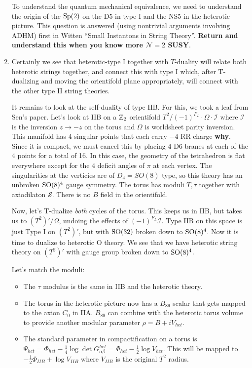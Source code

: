 \documentclass[11pt, class=article, crop=false]{standalone}
\begin{document}
\begin{enumerate}
	 To understand the quantum mechanical equivalence, we need to understand the origin of the $\mathrm{Sp}(2)$ on the D5 in type I and the NS5 in the heterotic picture. This question is answered (using nontrivial arguments involving ADHM) first in Witten ``Small Instantons in String Theory''. \textbf{Return and understand this when you know more $\mathcal N =2$ SUSY}.
	
	
	
	\item Certainly we see that heterotic-type I together with $T$-duality will relate both heterotic strings together, and connect this with type I which, after T-dualizing and moving the orientifold plane appropriately, will connect with the other type II string theories. 
	
	It remains to look at the self-duality of type IIB. For this, we took a leaf from Sen's paper. Let's look at IIB on a $\mathbb{Z}_2$ orientifold $T^2/(-1)^{F_L} \cdot \Omega \cdot \mathcal I$ where $\mathcal I$ is the inversion $z \to -z$ on the torus and $\Omega$ is worldsheet parity inversion. This manifold has 4 singular points that each carry $-4$ RR charge \textbf{why}. Since it is compact, we must cancel this by placing $4$ D6 branes at each of the 4 points for a total of 16. In this case, the geometry of the tetrahedron is flat everywhere except for the $4$ deficit angles of $\pi$ at each vertex. The singularities at the verticies are of $D_4 = SO(8)$ type, so this theory has an unbroken $\mathrm{SO}(8)^4$ gauge symmetry. The torus has moduli $T, \tau$ together with axiodilaton $\mathcal S$. There is no $B$ field in the orientifold.
	
	Now, let's T-dualize \emph{both} cycles of the torus. This keeps us in IIB, but takes us to $(T^2)'/\Omega$, undoing the effects of $(-1)^{F_L} \mathcal I$. Type IIB on this space is just Type I on $(T^2)'$, but with $\mathrm{SO}(32)$ broken down to $\mathrm{SO}(8)^4$. Now it is time to dualize to heterotic O theory. We see that we have heterotic string theory on $(T^2)'$ with gauge group broken down to $\mathrm{SO}(8)^4$. 
	
	Let's match the moduli: 
	\begin{itemize}
		\item The $\tau$ modulus is the same in IIB and the heterotic theory.
		\item The torus in the heterotic picture now has a $B_{89}$ scalar that gets mapped to the axion $C_0$ in IIA. $B_{89}$ can combine with the heterotic torus volume to provide another modular parameter $\rho = B + i V_{het}$. 
		\item The standard parameter in compactification on a torus is $\Psi_{het} = \Phi_{het} - \frac14 \log \det G_{\alpha \beta}^{het} = \Phi_{het} - \frac12 \log V_{het}$. This will be mapped to $-\frac12 \Phi_{IIB} + \log V_{IIB}$ where $V_{IIB}$ is the original $T^2$ radius. 
	\end{itemize} 
	

\end{enumerate}
\end{document}
